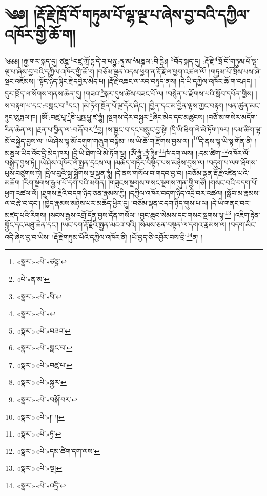 \chapter{༄༅། །རྡོ་རྗེ་ཁྲོ་བོ་གཏུམ་པོ་ལྷ་ལྔ་པ་ཞེས་བྱ་བའི་དཀྱིལ་འཁོར་གྱི་ཆོ་ག།}༄༅༅། །རྒྱ་གར་སྐད་དུ། ཙཎྜ་\footnote{«སྣར་»«པེ་»ཙནྜ་}བཛྲ་ཀྲོ་དྷ་དེ་བ་པཉྩ་:ནཱ་མ་\footnote{«པེ་»ན་མ་}མཎྜལ་:བི་དྷིཿ། \footnote{«སྣར་»«པེ་»བི་}བོད་སྐད་དུ། :རྡོ་རྗེ་\footnote{«སྣར་»«པེ་»}ཁྲོ་བོ་གཏུམ་པོ་ལྷ་ལྔ་པ་ཞེས་བྱ་བའི་དཀྱིལ་འཁོར་གྱི་ཆོ་ག །བཅོམ་ལྡན་འདས་ཕྱག་ན་རྡོ་རྗེ་ལ་ཕྱག་འཚལ་ལོ། །གཏུམ་པོ་ཁྲོས་པས་ཞེ་སྡང་འཇོམས། །སྟོང་ཉིད་སྙིང་རྗེ་དབྱེར་མེད་པ། །རྡོ་རྗེ་འཆང་ལ་རབ་བཏུད་ནས། །དེ་ཡི་དཀྱིལ་འཁོར་ཆོ་ག་བཤད། །དུར་ཁྲོད་ལ་སོགས་གནས་ཆེན་དུ། །གཟའ་\footnote{«སྣར་»«པེ་»བཟའ་}སྐར་དུས་ཚེས་བཟང་པོ་ལ། །བསྙེན་པ་རྫོགས་པའི་སློབ་དཔོན་གྱིས། །ས་བརྟག་པ་དང་:བསླང་བ་\footnote{«སྣར་»«པེ་»སླང་བ་}དང་། །མེ་ཏོག་སྔོན་པོ་ལྔ་དོར་ཞིང་། །བྱིན་དང་མ་བྱིན་ལྟས་ཀྱང་བརྟག །ཕན་ཚུན་མང་ཉུང་ཨུཏྤལ་ཁ། །ཨོཾ་:བཛྲ་པཱ་\footnote{«སྣར་»«པེ་»བཛྲ་པ་}ཎི་པུཥྤ་པཱུ་ཛ་ཧཱུཾ། །སྔགས་དེར་བསྐྱར་\footnote{«སྣར་»«པེ་»སྐྱར་}ཞིང་མེད་དང་མཚུངས། །བཙོ་མ་གསེར་མདོག་རིན་ཆེན་ལ། །རྔན་པ་བྱིན་ལ་:བརྐོ་བར་\footnote{«སྣར་»«པེ་»བསྐོ་བར་}བྱ། །ས་སྦྱང་བ་དང་བསྲུང་བྱ་སྟེ། །དྲི་ཡི་ཐིག་ལེ་མེ་ཏོག་ཁར། །དམ་ཚིག་ལྷ་མོ་བསྐྱེད་བྱས་ལ། །ཡེ་ཤེས་ལྷ་མོ་དགུག་གཞུག་བསྟིམ། །ས་ཡི་ཆོ་ག་རྫོགས་བྱས་ལ། །\footnote{«སྣར་»«པེ་»།། །།}དེ་ནས་ལྷ་ཡི་སྟ་གོན་ནི། །མཎྜལ་ཡིད་འོང་དྲི་མེད་ཁར། །དྲི་ཡི་ཐིག་ལེ་མེ་ཏོག་ལྔ། །ཨོཾ་ཧཱུཾ་:ཏྲཱཾ་ཧྲཱིཿ་\footnote{«སྣར་»«པེ་»ཏྲཾ་}ཁཾ་དག་ལས། །:དམ་ཚིག་\footnote{«སྣར་»«པེ་»དམ་ཚིག་དག་ལས་}འཁོར་ལོ་བསྐྱེད་བྱས་ཏེ། །ཡེ་ཤེས་འཁོར་ལོ་སྤྱན་དྲངས་ལ། །མཆོད་གཏོར་བསྟོད་པས་མཉེས་བྱས་ལ། །བདུག་པ་ལག་ཐོགས་པུས་བཙུགས་ཏེ། །དྲིལ་བུའི་སྒྲ་སྒྲོགས་ལྔ་ལྡན་ཧཱུཾ། །དེ་ནས་གསོལ་བ་གདབ་བྱ་བ། །བཅོམ་ལྡན་རྡོ་རྗེ་འཛིན་པའི་མཆོག །རིག་སྔགས་རྒྱལ་པོ་དགེ་བའི་མགོན། །གཟུངས་སྔགས་གསང་སྔགས་ཀུན་གྱི་གཙོ། །གསང་བའི་བདག་པོ་ཕྱག་འཚལ་ལོ། །ཐུགས་རྗེའི་བདག་ཉིད་ཅན་རྣམས་ཀྱི། །དཀྱིལ་འཁོར་བདག་ཉིད་འདྲི་བར་འཚལ། །སློབ་མ་རྣམས་ལ་བརྩེ་བ་དང་། །ཁྱེད་རྣམས་མཉེས་པར་མཆོད་ཕྱིར་དུ། །བཅོམ་ལྡན་བདག་ཉིད་གུས་པ་ལ། །དེ་ཡི་གནང་བར་མཛད་པའི་རིགས། །སངས་རྒྱས་འགྲོ་དོན་བྱས་དོན་གསོལ། །བྱང་ཆུབ་སེམས་དང་གསང་སྔགས་ལྷ།\footnote{«སྣར་»«པེ་»ལྔ།} །འཇིག་རྟེན་སྐྱོང་དང་མཐུ་ཆེན་དང་། །ཡང་དག་རྡོ་རྗེའི་སྤྱན་མངའ་བའི། །སེམས་ཅན་བསྟན་ལ་དགའ་རྣམས་ལ། །བདག་མིང་འདི་ཞེས་བྱ་བ་ཡིས། །རྡོ་རྗེ་གཏུམ་པོའི་དཀྱིལ་འཁོར་ནི། །ཡོ་བྱད་ཅི་འབྱོར་བས་བྲི་\footnote{«སྣར་»«པེ་»འདྲི་}ན། །
